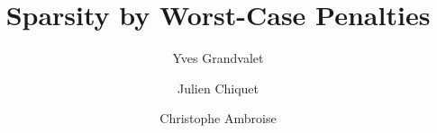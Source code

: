 \documentclass[preprint,12pt,authoryear]{elsarticle}
\begin{document}
\begin{frontmatter}






\title{Sparsity by Worst-Case Penalties}


\author{Yves Grandvalet}
\address{Sorbonne universit\'es, Universit\'e de technologie de Compi\`egne, 
CNRS, \\ Heudiasyc UMR 7253, CS 60 319, 60 203 Compi\`egne cedex, France}
\author{Julien Chiquet}
\author{Christophe Ambroise}
\address{ Laboratoire de Math\'ematiques et Mod\`elisation d'\'Evry val d'Essonne\\
        CNRS UMR 8071 \& Universit\'e d'\'Evry
        23, Boulevard de France\\
       91000 \'Evry, FRANCE}




\end{frontmatter}
\end{document}
